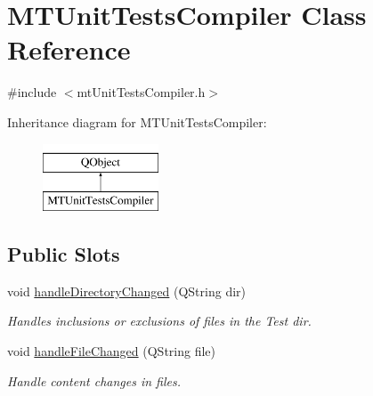 \hypertarget{class_m_t_unit_tests_compiler}{}\section{M\+T\+Unit\+Tests\+Compiler Class Reference}
\label{class_m_t_unit_tests_compiler}


{\ttfamily \#include $<$mt\+Unit\+Tests\+Compiler.\+h$>$}

Inheritance diagram for M\+T\+Unit\+Tests\+Compiler\+:\begin{figure}[H]
\begin{center}
\leavevmode
\includegraphics[height=2.000000cm]{class_m_t_unit_tests_compiler}
\end{center}
\end{figure}
\subsection*{Public Slots}
\begin{DoxyCompactItemize}
\item 
void \mbox{\hyperlink{class_m_t_unit_tests_compiler_a87e718123e996863f9eeae8e50967407}{handle\+Directory\+Changed}} (Q\+String dir)
\begin{DoxyCompactList}\small\item\em Handles inclusions or exclusions of files in the Test dir. \end{DoxyCompactList}\item 
void \mbox{\hyperlink{class_m_t_unit_tests_compiler_ad8f142f5b3dc90fbca24ba35456681be}{handle\+File\+Changed}} (Q\+String file)
\begin{DoxyCompactList}\small\item\em Handle content changes in files. \end{DoxyCompactList}\end{DoxyCompactItemize}
